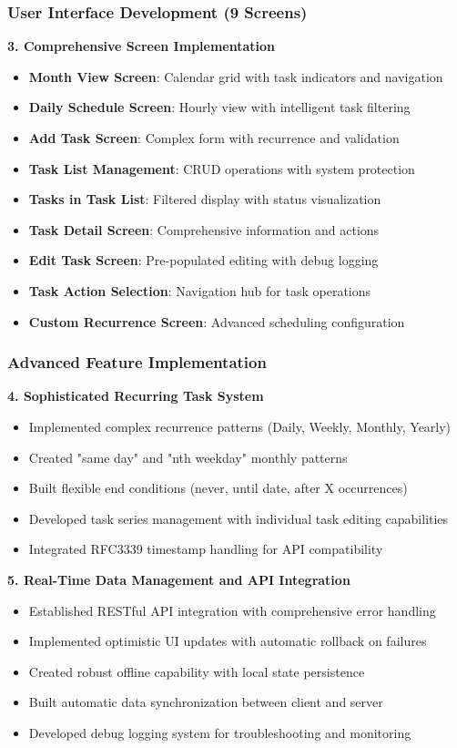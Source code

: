 \subsubsection{User Interface Development (9 Screens)}

\textbf{3. Comprehensive Screen Implementation}
\begin{itemize}
    \item \textbf{Month View Screen}: Calendar grid with task indicators and navigation
    \item \textbf{Daily Schedule Screen}: Hourly view with intelligent task filtering
    \item \textbf{Add Task Screen}: Complex form with recurrence and validation
    \item \textbf{Task List Management}: CRUD operations with system protection
    \item \textbf{Tasks in Task List}: Filtered display with status visualization
    \item \textbf{Task Detail Screen}: Comprehensive information and actions
    \item \textbf{Edit Task Screen}: Pre-populated editing with debug logging
    \item \textbf{Task Action Selection}: Navigation hub for task operations
    \item \textbf{Custom Recurrence Screen}: Advanced scheduling configuration
\end{itemize}

\subsubsection{Advanced Feature Implementation}

\textbf{4. Sophisticated Recurring Task System}
\begin{itemize}
    \item Implemented complex recurrence patterns (Daily, Weekly, Monthly, Yearly)
    \item Created "same day" and "nth weekday" monthly patterns
    \item Built flexible end conditions (never, until date, after X occurrences)
    \item Developed task series management with individual task editing capabilities
    \item Integrated RFC3339 timestamp handling for API compatibility
\end{itemize}

\textbf{5. Real-Time Data Management and API Integration}
\begin{itemize}
    \item Established RESTful API integration with comprehensive error handling
    \item Implemented optimistic UI updates with automatic rollback on failures
    \item Created robust offline capability with local state persistence
    \item Built automatic data synchronization between client and server
    \item Developed debug logging system for troubleshooting and monitoring
\end{itemize}

